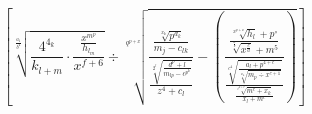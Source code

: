 \documentclass[10pt,a4paper]{article}
\begin{document}
$$\left[ \sqrt[\frac{a_1}{b^4}]{\frac{4^{4_k}}{k_{l+m}}\cdot \frac{\frac{x^{m^p}}{h_{l_m}}}{x^{f+6}}}\div \sqrt[q^{p+x}]{\frac{\frac{\sqrt[x_k]{p^{d_k}}}{m_j-c_{lk}}}{\frac{\sqrt[2^l]{\frac{d^p+l}{m_{lp}-c^{p^k}}}}{z^4+c_l}}-\left( \frac{\frac{\sqrt[x^{p+x}]{h_l}+p^\circ}{\sqrt[\frac{a}{b}]{x^{\frac{c}{d}}}+m^5}}{\frac{\sqrt[c^4]{\frac{a_l+p^{4+c}}{\sqrt[x_6]{m_p\div x^{c+1}}}}}{\frac{\sqrt[t^{a+c}]{m^c+x_k}}{x_l+m^c}}}  \right)} \right]$$
\end{document}
